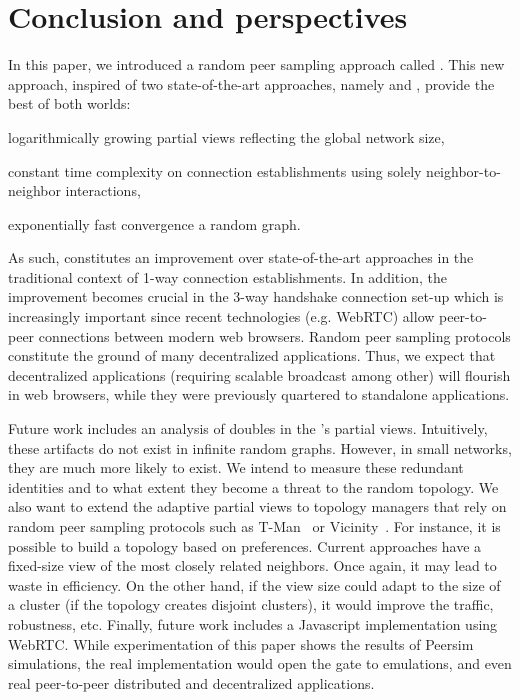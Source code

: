 
\section{Conclusion and perspectives}
\label{sec:conclusion}

In this paper, we introduced a random peer sampling approach called
\SCAMPLON{}.  This new approach, inspired of two state-of-the-art approaches,
namely \SCAMP{} and \CYCLON{}, provide the best of both worlds:
\begin{inparaenum}[(i)]
\item logarithmically growing partial views reflecting the global network size,
\item constant time complexity on connection establishments using solely
  neighbor-to-neighbor interactions,
\item exponentially fast convergence a random graph.
\end{inparaenum}
As such, \SCAMPLON{} constitutes an improvement over state-of-the-art
approaches in the traditional context of 1-way connection establishments. In
addition, the improvement becomes crucial in the 3-way handshake connection
set-up which is increasingly important since recent technologies (e.g. WebRTC)
allow peer-to-peer connections between modern web browsers. Random peer
sampling protocols constitute the ground of many decentralized applications.
Thus, we expect that decentralized applications (requiring scalable broadcast
among other) will flourish in web browsers, while they were previously
quartered to standalone applications.

Future work includes an analysis of doubles in the \SCAMPLON{}'s partial views.
Intuitively, these artifacts do not exist in infinite random graphs. However,
in small networks, they are much more likely to exist. We intend to measure
these redundant identities and to what extent they become a threat to the
random topology.  We also want to extend the adaptive partial views to topology
managers that rely on random peer sampling protocols such as
T-Man~\cite{jelasity2009tman} or Vicinity~\cite{voulgaris2005epidemic}. For
instance, it is possible to build a topology based on preferences. Current
approaches have a fixed-size view of the most closely related neighbors. Once
again, it may lead to waste in efficiency. On the other hand, if the view size
could adapt to the size of a cluster (if the topology creates disjoint
clusters), it would improve the traffic, robustness, etc. Finally, future work
includes a Javascript implementation using WebRTC. While experimentation of
this paper shows the results of Peersim simulations, the real implementation
would open the gate to emulations, and even real peer-to-peer distributed and
decentralized applications.

